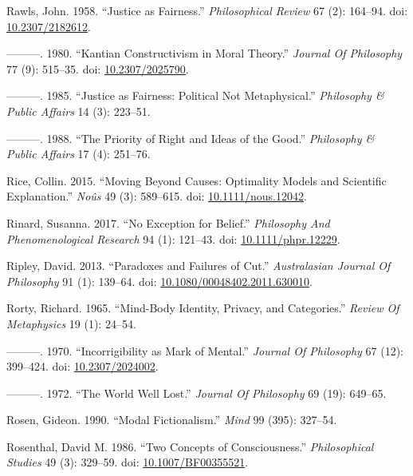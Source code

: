 \documentclass[
  10pt,
  letterpaper,
  DIV=11,
  numbers=noendperiod,
  twoside]{scrartcl}
\newlength{\cslhangindent}
\newenvironment{CSLReferences}[2] %
 {\begin{list}{}{%
  \setlength{\itemindent}{0pt}
  \setlength{\leftmargin}{0pt}
  \setlength{\parsep}{0pt}
  \ifodd #1
   \setlength{\leftmargin}{\cslhangindent}
   \setlength{\itemindent}{-1\cslhangindent}
  \fi
  \setlength{\itemsep}{#2\baselineskip}}}
 {\end{list}}
\begin{document}
\begin{CSLReferences}{1}{0}
Rawls, John. 1958. {``Justice as Fairness.''} \emph{Philosophical
Review} 67 (2): 164--94. doi:
\href{https://doi.org/10.2307/2182612}{10.2307/2182612}.

---------. 1980. {``Kantian Constructivism in Moral Theory.''}
\emph{Journal Of Philosophy} 77 (9): 515--35. doi:
\href{https://doi.org/10.2307/2025790}{10.2307/2025790}.

---------. 1985. {``Justice as Fairness: Political Not Metaphysical.''}
\emph{Philosophy \& Public Affairs} 14 (3): 223--51.

---------. 1988. {``The Priority of Right and Ideas of the Good.''}
\emph{Philosophy \& Public Affairs} 17 (4): 251--76.

Rice, Collin. 2015. {``Moving Beyond Causes: Optimality Models and
Scientific Explanation.''} \emph{Noûs} 49 (3): 589--615. doi:
\href{https://doi.org/10.1111/nous.12042}{10.1111/nous.12042}.

Rinard, Susanna. 2017. {``No Exception for Belief.''} \emph{Philosophy
And Phenomenological Research} 94 (1): 121--43. doi:
\href{https://doi.org/10.1111/phpr.12229}{10.1111/phpr.12229}.

Ripley, David. 2013. {``Paradoxes and Failures of Cut.''}
\emph{Australasian Journal Of Philosophy} 91 (1): 139--64. doi:
\href{https://doi.org/10.1080/00048402.2011.630010}{10.1080/00048402.2011.630010}.

Rorty, Richard. 1965. {``Mind-Body Identity, Privacy, and Categories.''}
\emph{Review Of Metaphysics} 19 (1): 24--54.

---------. 1970. {``Incorrigibility as Mark of Mental.''} \emph{Journal
Of Philosophy} 67 (12): 399--424. doi:
\href{https://doi.org/10.2307/2024002}{10.2307/2024002}.

---------. 1972. {``The World Well Lost.''} \emph{Journal Of Philosophy}
69 (19): 649--65.

Rosen, Gideon. 1990. {``Modal Fictionalism.''} \emph{Mind} 99 (395):
327--54.

Rosenthal, David M. 1986. {``Two Concepts of Consciousness.''}
\emph{Philosophical Studies} 49 (3): 329--59. doi:
\href{https://doi.org/10.1007/BF00355521}{10.1007/BF00355521}.


\end{CSLReferences}
\end{document}
